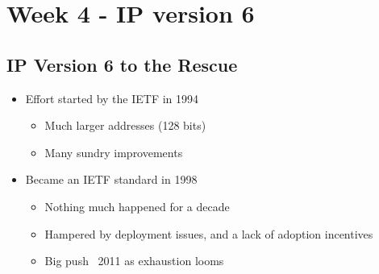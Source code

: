 \documentclass[12pt]{ctexart}   %
\begin{document}
\section{Week 4 - IP version 6}
	\subsection{IP Version 6 to the Rescue}
	\begin{itemize}
		\item Effort started by the IETF in 1994
		\begin{itemize}
			\item Much larger addresses (128 bits)
			\item Many sundry improvements
		\end{itemize}
		
		\item Became an IETF standard in 1998
		\begin{itemize}
			\item Nothing much happened for a decade
			\item Hampered by deployment issues, and a lack of adoption incentives
			\item Big push ~2011 as exhaustion looms
		\end{itemize}
	\end{itemize}
	
\end{document}
